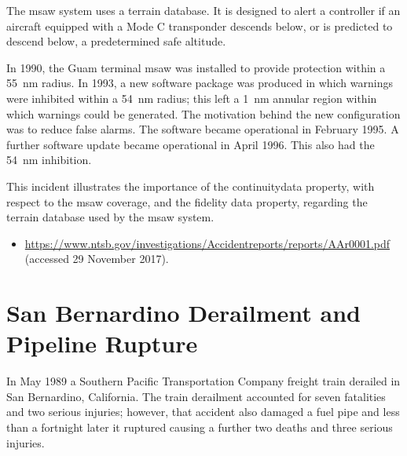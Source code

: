 The \gls{msaw} system uses a terrain \gls{database}. It is designed to alert a controller if an aircraft equipped with a Mode C transponder descends below, or is predicted to descend below, a predetermined safe altitude.

In 1990, the Guam terminal \gls{msaw} was installed to provide protection within a 55~nm radius. In 1993, a new software package was produced in which warnings were inhibited within a 54~nm radius; this left a 1~nm annular region within which warnings could be generated. The motivation behind the new configuration was to reduce false alarms. The software became operational in February 1995. A further software update became operational in April 1996. This also had the 54~nm inhibition.

This incident illustrates the importance of the \gls{continuity}\gls{data property}, with respect to the \gls{msaw} coverage, and the \gls{fidelity} \gls{data property},
regarding
the terrain \gls{database} used by the \gls{msaw} system.

\begin{samepage}
\begin{itemize}
	\item \raggedright{\href{https://www.ntsb.gov/investigations/Accidentreports/reports/AAr0001.pdf}{https://www.ntsb.gov/investigations/Accidentreports/reports/AAr0001.pdf} (accessed 29 November 2017).}
\end{itemize}
\end{samepage}

\section{San Bernardino Derailment and Pipeline Rupture} \label{bkm:incacc:sanbernardino}
In May 1989 a Southern Pacific Transportation Company freight train derailed in San Bernardino, California. The train derailment accounted for seven fatalities and two serious injuries; however, that accident also damaged a fuel pipe and less than a fortnight later it ruptured causing a further two deaths and three serious injuries.

